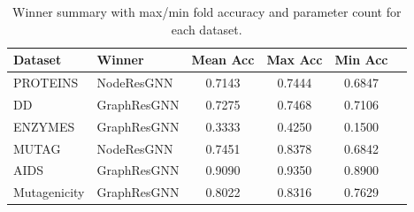 \begin{table}[t]
\centering
\footnotesize
\caption{Winner summary with max/min fold accuracy and parameter count for each dataset.}
\label{tab:all_winners}
\begin{tabular}{l l c c c c}
\toprule
Dataset & Winner & Mean Acc & Max Acc & Min Acc \\
\midrule
PROTEINS & NodeResGNN & 0.7143 & 0.7444 & 0.6847 \\
DD & GraphResGNN & 0.7275 & 0.7468 & 0.7106 \\
ENZYMES & GraphResGNN & 0.3333 & 0.4250 & 0.1500 \\
MUTAG & NodeResGNN & 0.7451 & 0.8378 & 0.6842 \\
AIDS & GraphResGNN & 0.9090 & 0.9350 & 0.8900 \\
Mutagenicity & GraphResGNN & 0.8022 & 0.8316 & 0.7629 \\
\bottomrule
\end{tabular}
\end{table}
